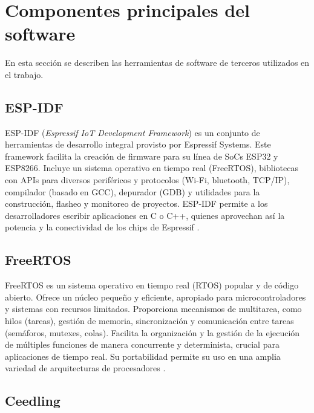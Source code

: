 


\section{Componentes principales del software}
\label{sec:sw:components}
En esta sección se describen las herramientas de software de terceros utilizados en el trabajo.


\subsection{ESP-IDF}

ESP-IDF (\textit{Espressif IoT Development Framework}) es un conjunto de herramientas de desarrollo integral provisto por Espressif Systems. Este framework facilita la creación de firmware para su línea de SoCs ESP32 y ESP8266. Incluye un sistema operativo en tiempo real (FreeRTOS), bibliotecas con APIs para diversos periféricos y protocolos (Wi-Fi, bluetooth, TCP/IP), compilador (basado en GCC), depurador (GDB) y utilidades para la construcción, flasheo y monitoreo de proyectos. ESP-IDF permite a los desarrolladores escribir aplicaciones en C o C++, quienes aprovechan así la potencia y la conectividad de los chips de Espressif \cite{ESPIDF}.


\subsection{FreeRTOS}

FreeRTOS es un sistema operativo en tiempo real (RTOS) popular y de código abierto. Ofrece un núcleo pequeño y eficiente, apropiado para microcontroladores y sistemas con recursos limitados. Proporciona mecanismos de multitarea, como hilos (tareas), gestión de memoria, sincronización y comunicación entre tareas (semáforos, mutexes, colas). Facilita la organización y la gestión de la ejecución de múltiples funciones de manera concurrente y determinista, crucial para aplicaciones de tiempo real. Su portabilidad permite su uso en una amplia variedad de arquitecturas de procesadores \cite{FREERTOS}.

\subsection{Ceedling}

